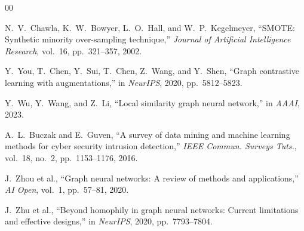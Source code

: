 \documentclass[conference]{IEEEtran}
\begin{document}

\begin{thebibliography}{00}

N.~V.~Chawla, K.~W.~Bowyer, L.~O.~Hall, and W.~P.~Kegelmeyer, ``SMOTE: Synthetic minority over-sampling technique,'' \textit{Journal of Artificial Intelligence Research}, vol.~16, pp.~321--357, 2002.

Y.~You, T.~Chen, Y.~Sui, T.~Chen, Z.~Wang, and Y.~Shen, ``Graph contrastive learning with augmentations,'' in \textit{NeurIPS}, 2020, pp.~5812--5823.

Y.~Wu, Y.~Wang, and Z.~Li, ``Local similarity graph neural network,'' in \textit{AAAI}, 2023.

A.~L.~Buczak and E.~Guven, ``A survey of data mining and machine learning methods for cyber security intrusion detection,'' \textit{IEEE Commun. Surveys Tuts.}, vol.~18, no.~2, pp.~1153--1176, 2016.

J.~Zhou et al., ``Graph neural networks: A review of methods and applications,'' \textit{AI Open}, vol.~1, pp.~57--81, 2020.

J.~Zhu et al., ``Beyond homophily in graph neural networks: Current limitations and effective designs,'' in \textit{NeurIPS}, 2020, pp.~7793--7804.

\end{thebibliography}
\end{document}
